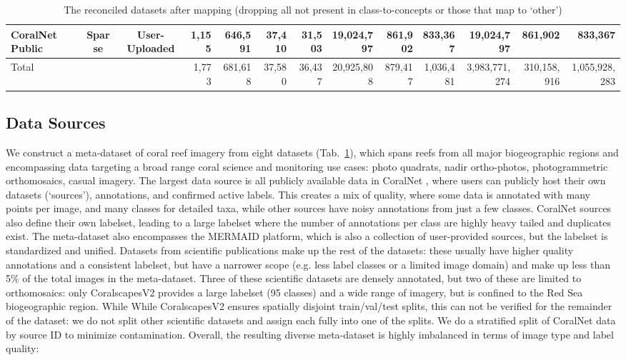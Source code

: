 \documentclass[10pt,twocolumn,letterpaper]{article}
\begin{document}
\begin{table}[t!]
{\begin{tabular}{lccr|rrr|rrr|rrr}
        CoralNet Public \citep{beijbom2012automated}
        & Sparse & User-Uploaded & 1,155
        & 646,591 & 37,410 & 31,503
        & 19,024,797 & 861,902 & 833,367
        & 19,024,797 & 861,902 & 833,367
         \\
    \midrule
        Total & & & 1,773
        & 681,618 & 37,580 & 36,437
        & 20,925,808 & 879,417 & 1,036,481
        & 3,983,771,274 & 310,158,916 & 1,055,928,283
         \\

    \bottomrule
    \end{tabular}%
    }
    \caption{The reconciled datasets after mapping (dropping all not present in class-to-concepts or those that map to `other')}
    \label{tab:dataset}
\end{table}

\subsection{Data Sources}
We construct a meta-dataset of coral reef imagery from eight datasets (Tab.~\ref{tab:dataset}), which spans reefs from all major biogeographic regions and encompassing data targeting a broad range coral science and monitoring use cases: photo quadrats, nadir ortho-photos, photogrammetric orthomosaics, casual imagery. The largest data source is all publicly available data in CoralNet \cite{beijbom2012automated}, where users can publicly host their own datasets (`sources'), annotations, and confirmed active labels. This creates a mix of quality, where some data is annotated with many points per image, and many classes for detailed taxa, while other sources have noisy annotations from just a few classes. CoralNet sources also define their own labelset, leading to a large labelset where the number of annotations per class are highly heavy tailed and duplicates exist.
The meta-dataset also encompasses the MERMAID platform, which is also a collection of user-provided sources, but the labelset is standardized and unified. Datasets from scientific publications make up the rest of the datasets: these usually have higher quality annotations and a consistent labelset, but have a narrower scope (e.g. less label classes or a limited image domain) and make up less than 5\% of the total images in the meta-dataset. Three of these scientific datasets are densely annotated, but two of these are limited to orthomosaics: only CoralscapesV2 provides a large labelset (95 classes) and a wide range of imagery, but is confined to the Red Sea biogeographic region. While While CoralscapesV2 ensures spatially disjoint train/val/test splits, this can not be verified for the remainder of the dataset: we do not split other scientific datasets and assign each fully into one of the splits. We do a stratified split of CoralNet data by source ID to minimize contamination. Overall, the resulting diverse meta-dataset is highly imbalanced in terms of image type and label quality:
\end{document}
